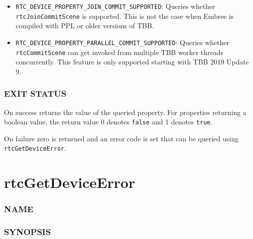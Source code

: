 \begin{itemize}
  \begin{enumerate}
  \def\labelenumi{\arabic{enumi}.}
  \setcounter{enumi}{-1}
  \tightlist
  \item
    internal tasking system
  \item
    Intel Threading Building Blocks (TBB)
  \item
    Parallel Patterns Library (PPL)
  \end{enumerate}
\item
  \texttt{RTC\_DEVICE\_PROPERTY\_JOIN\_COMMIT\_SUPPORTED}: Queries
  whether \texttt{rtcJoinCommitScene} is supported. This is not the case
  when Embree is compiled with PPL or older versions of TBB.
\item
  \texttt{RTC\_DEVICE\_PROPERTY\_PARALLEL\_COMMIT\_SUPPORTED}: Queries
  whether \texttt{rtcCommitScene} can get invoked from multiple TBB
  worker threads concurrently. This feature is only supported starting
  with TBB 2019 Update 9.
\end{itemize}

\subsubsection{EXIT STATUS}\label{exit-status}

On success returns the value of the queried property. For properties
returning a boolean value, the return value 0 denotes \texttt{false} and
1 denotes \texttt{true}.

On failure zero is returned and an error code is set that can be queried
using \texttt{rtcGetDeviceError}.

\pagebreak

\section{rtcGetDeviceError}\label{rtcgetdeviceerror}

\subsubsection{NAME}\label{name}

\begin{Shaded}
\begin{Highlighting}[]
\OperatorTok{{-}}
\end{Highlighting}
\end{Shaded}

\subsubsection{SYNOPSIS}\label{synopsis}

